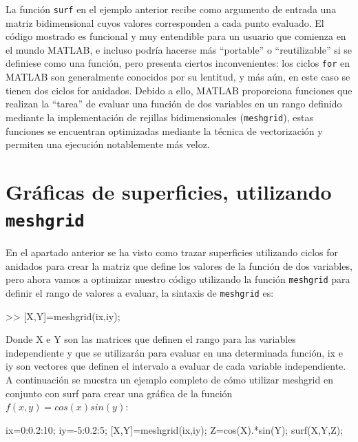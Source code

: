 La función \texttt{surf} en el ejemplo anterior recibe como argumento de
entrada una matriz bidimensional cuyos valores corresponden a cada punto
evaluado. El código mostrado es funcional y muy entendible para un
usuario que comienza en el mundo MATLAB, e incluso podría hacerse más
``portable'' o ``reutilizable'' si se definiese como una función, pero
presenta ciertos inconvenientes: los ciclos \texttt{for} en MATLAB son
generalmente conocidos por su lentitud, y más aún, en este caso se
tienen dos ciclos for anidados. Debido a ello, MATLAB proporciona
funciones que realizan la ``tarea'' de evaluar una función de dos
variables en un rango definido mediante la implementación de rejillas
bidimensionales (\texttt{meshgrid}), estas funciones se encuentran
optimizadas mediante la técnica de vectorización y permiten una
ejecución notablemente más veloz.

\section{Gráficas de superficies, utilizando \texttt{meshgrid}}

En el apartado anterior se ha visto como trazar superficies utilizando
ciclos for anidados para crear la matriz que define los valores de la
función de dos variables, pero ahora vamos a optimizar nuestro código
utilizando la función \texttt{meshgrid} para definir el rango de valores
a evaluar, la sintaxis de \texttt{meshgrid} es:

\begin{matlab}
>> [X,Y]=meshgrid(ix,iy);
\end{matlab}

Donde X e Y son las matrices que definen el rango para las variables
independiente y que se utilizarán para evaluar en una determinada
función, ix e iy son vectores que definen el intervalo a evaluar de cada
variable independiente. A continuación se muestra un ejemplo completo de
cómo utilizar meshgrid en conjunto con surf para crear una gráfica de la
función  $f(x,y)=cos(x) sin(y)$:

\begin{matlab}
ix=0:0.2:10;
iy=-5:0.2:5;
[X,Y]=meshgrid(ix,iy);
Z=cos(X).*sin(Y);
surf(X,Y,Z);
\end{matlab}

